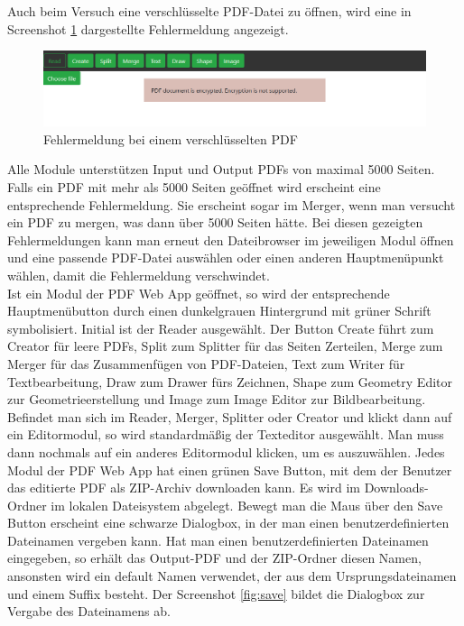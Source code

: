 Auch beim Versuch eine verschlüsselte PDF-Datei zu öffnen, wird eine in Screenshot \ref{fig:errorcrypt} dargestellte Fehlermeldung angezeigt.

\begin{figure}[!htbp]
	\centering
	\includegraphics[width=1\textwidth]{"images/errorcrypt.png"}
	\caption{Fehlermeldung bei einem verschlüsselten PDF}
	\label{fig:errorcrypt}
\end{figure}

Alle Module unterstützen Input und Output PDFs von maximal 5000 Seiten. Falls ein PDF mit mehr als 5000 Seiten geöffnet wird erscheint eine entsprechende Fehlermeldung. Sie erscheint sogar im Merger, wenn man versucht ein PDF zu mergen, was dann über 5000 Seiten hätte. Bei diesen gezeigten Fehlermeldungen kann man erneut den Dateibrowser im jeweiligen Modul öffnen und eine passende PDF-Datei auswählen oder einen anderen Hauptmenüpunkt wählen, damit die Fehlermeldung verschwindet. \\
Ist ein Modul der PDF Web App geöffnet, so wird der entsprechende Hauptmenübutton durch einen dunkelgrauen Hintergrund mit grüner Schrift symbolisiert. Initial ist der Reader ausgewählt. Der Button Create führt zum Creator für leere PDFs, Split zum Splitter für das Seiten Zerteilen, Merge zum Merger für das Zusammenfügen von PDF-Dateien, Text zum Writer für Textbearbeitung, Draw zum Drawer fürs Zeichnen, Shape zum Geometry Editor zur Geometrieerstellung und Image zum Image Editor zur Bildbearbeitung. Befindet man sich im Reader, Merger, Splitter oder Creator und klickt dann auf ein Editormodul, so wird standardmäßig der Texteditor ausgewählt. Man muss dann nochmals auf ein anderes Editormodul klicken, um es auszuwählen. Jedes Modul der PDF Web App hat einen grünen Save Button, mit dem der Benutzer das editierte PDF als ZIP-Archiv downloaden kann. Es wird im Downloads-Ordner im lokalen Dateisystem abgelegt. Bewegt man die Maus über den Save Button erscheint eine schwarze Dialogbox, in der man einen benutzerdefinierten Dateinamen vergeben kann. Hat man einen benutzerdefinierten Dateinamen eingegeben, so erhält das Output-PDF und der ZIP-Ordner diesen Namen, ansonsten wird ein default Namen verwendet, der aus dem Ursprungsdateinamen und einem Suffix besteht. Der Screenshot \ref{fig:save} bildet die Dialogbox zur Vergabe des Dateinamens ab. 

